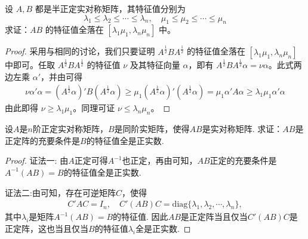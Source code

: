 \documentclass[../../main.tex]{subfiles}%
\begin{document}
\begin{proposition}\label{proposition:例9.65}
设 \(A,B\) 都是半正定实对称矩阵，其特征值分别为
\[
\lambda_1 \leqslant  \lambda_2 \leqslant  \cdots \leqslant  \lambda_n,\quad \mu_1 \leqslant  \mu_2 \leqslant  \cdots \leqslant  \mu_n
\]
求证：\(AB\) 的特征值全落在 \([\lambda_1\mu_1,\lambda_n\mu_n]\) 中。
\end{proposition}
\begin{proof}

采用与相同的讨论，我们只要证明 \(A^{\frac{1}{2}}BA^{\frac{1}{2}}\) 的特征值全落在 \([\lambda_1\mu_1,\lambda_n\mu_n]\) 中即可。任取 \(A^{\frac{1}{2}}BA^{\frac{1}{2}}\) 的特征值 \(\nu\) 及其特征向量 \(\alpha\)，即有 \(A^{\frac{1}{2}}BA^{\frac{1}{2}}\alpha = \nu\alpha\)。此式两边左乘 \(\alpha'\)，并由可得
\begin{align*}
\nu\alpha'\alpha = (A^{\frac{1}{2}}\alpha)'B(A^{\frac{1}{2}}\alpha) \geqslant  \mu_1(A^{\frac{1}{2}}\alpha)'(A^{\frac{1}{2}}\alpha) = \mu_1\alpha'A\alpha \geqslant  \lambda_1\mu_1\alpha'\alpha
\end{align*}
由此即得 \(\nu \geqslant  \lambda_1\mu_1\)。同理可证 \(\nu \leqslant  \lambda_n\mu_n\)。

\end{proof}

\begin{proposition}\label{proposition:例9.66}
设\(A\)是\(n\)阶正定实对称矩阵，\(B\)是同阶实矩阵，使得\(AB\)是实对称矩阵. 求证：\(AB\)是正定阵的充要条件是\(B\)的特征值全是正实数.
\end{proposition}
\begin{proof}

{\color{blue}证法一:}
由\(A\)正定可得\(A^{-1}\)也正定，再由可知，\(AB\)正定的充要条件是\(A^{-1}(AB) = B\)的特征值全是正实数.

{\color{blue}证法二:}由可知，存在可逆矩阵\(C\)，使得
\begin{align*}
C'AC = I_n,\quad C'(AB)C = \mathrm{diag}\{\lambda_1,\lambda_2,\cdots,\lambda_n\},
\end{align*}
其中\(\lambda_i\)是矩阵\(A^{-1}(AB)=B\)的特征值. 因此\(AB\)是正定阵当且仅当\(C'(AB)C\)是正定阵，这也当且仅当\(B\)的特征值\(\lambda_i\)全是正实数.

\end{proof}
\end{document}
